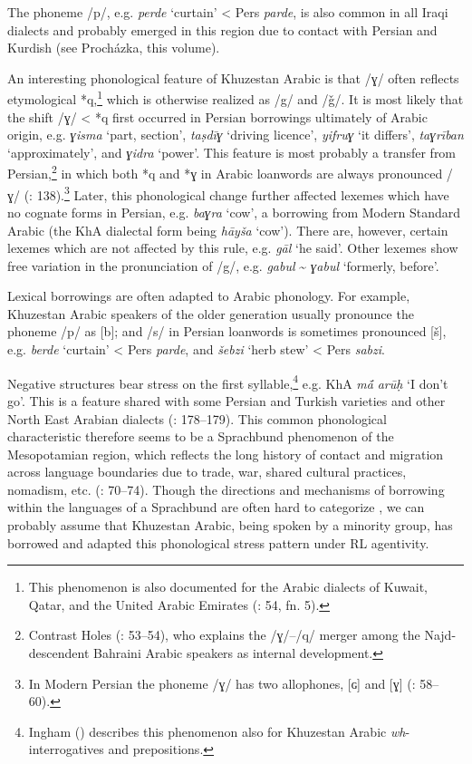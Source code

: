 \documentclass[output=paper,nonflat]{langsci/langscibook}
\begin{document}
The phoneme /p/, e.g. \textit{perde} ‘curtain’ < Pers \textit{parde}, is also common in all Iraqi dialects and probably emerged in this region due to contact with Persian and Kurdish (see Procházka, this volume). 

An interesting phonological feature of Khuzestan Arabic is that /ɣ/ often reflects etymological *q,\footnote{This phenomenon is also documented for the Arabic dialects of Kuwait, Qatar, and the United Arabic Emirates (\citealt{Holes2016}: 54, fn. 5).} which is otherwise realized as /g/ and /ǧ/. It is most likely that the shift /ɣ/ < *q first occurred in Persian borrowings ultimately of Arabic origin, e.g. \textit{ɣisma} ‘part, section’, \textit{taṣdīɣ} ‘driving licence’, \textit{yifruɣ} ‘it differs’, \textit{taɣrīban} ‘approximately’, and \textit{ɣidra} ‘power’. This feature is most probably a transfer from Persian,\footnote{Contrast Holes (\citeyear{Holes2016}: 53–54), who explains the /ɣ/–/q/ merger among the Najd-descendent Bahraini Arabic speakers as internal development.} in which both *q and *ɣ in Arabic loanwords are always pronounced /ɣ/ (\citealt{MatrasShabibi2007}: 138).\footnote{In Modern Persian the phoneme /ɣ/ has two allophones, [ɢ] and [ɣ] (\citealt{Majidi1986}: 58–60).} Later, this phonological change further affected lexemes which have no cognate forms in Persian, e.g. \textit{baɣra} `cow', a borrowing from Modern Standard Arabic (the KhA dialectal form being \textit{hāyša} `cow'). There are, however, certain lexemes which are not affected by this rule, e.g. \textit{gāl} `he said'. Other lexemes show free variation in the pronunciation of /g/, e.g. \textit{gabul} \~{} \textit{ɣabul} `formerly, before'.

Lexical borrowings are often adapted to Arabic phonology. For example, Khuzestan Arabic speakers of the older generation usually pronounce the phoneme /p/ as [b]; and /s/ in Persian loanwords is sometimes pronounced [š], e.g. \textit{berde} ‘curtain’ < Pers \textit{parde}, and \textit{šebzi} ‘herb stew’ < Pers \textit{sabzi}. 

Negative structures bear stress on the first syllable,\footnote{Ingham (\citeyear[724]{Ingham1991}) describes this phenomenon also for Khuzestan Arabic \textit{wh}-interrogatives and prepositions.} e.g. KhA \textit{mā́} \textit{arūḥ} ‘I don’t go’. This is a feature shared with some Persian and Turkish varieties and other North East Arabian dialects (\citealt{Ingham2005}: 178–179). This common phonological characteristic therefore seems to be a Sprachbund phenomenon of the Mesopotamian region, which reflects the long history of contact and migration across language boundaries due to trade, war, shared cultural practices, nomadism, etc. (\citealt{Winford2003}: 70–74). Though the directions and mechanisms of borrowing within the languages of a Sprachbund are often hard to categorize \citep[74]{Winford2003}, we can probably assume that Khuzestan Arabic, being spoken by a minority group, has borrowed and adapted this phonological stress pattern under RL agentivity.
\end{document}
